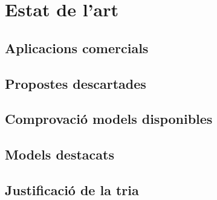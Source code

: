 \section{Estat de l'art}

\subsection{Aplicacions comercials}
\subsection{Propostes descartades}
\subsection{Comprovació models disponibles}
\subsection{Models destacats}
\subsection{Justificació de la tria}